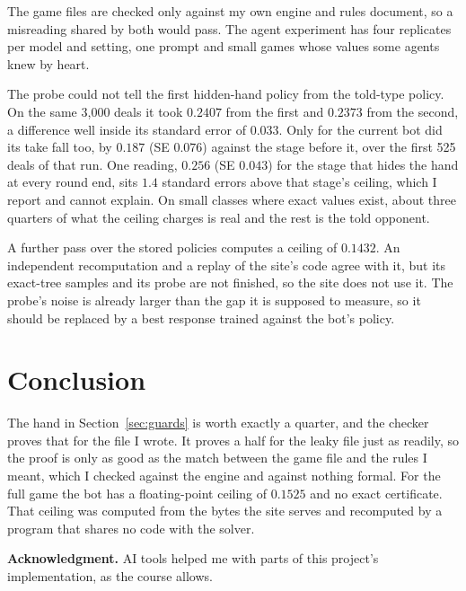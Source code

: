 \documentclass[11pt]{article}
\newcommand{\servedbound}{0.1525}      %
\begin{document}
The game files are
checked only against my own engine and rules document, so a misreading shared by both would pass.
The agent experiment has four replicates per model and setting, one prompt and small games whose values some
agents knew by heart.

The probe could not tell the first hidden-hand policy from the told-type policy.
On the same 3,000 deals it took $0.2407$ from the first and $0.2373$ from the second,
a difference well inside its standard error of $0.033$. Only for the current bot did its take
fall too, by $0.187$ (SE $0.076$) against the stage before it, over the first 525 deals of that run. One reading,
$0.256$ (SE $0.043$) for the stage that hides the hand at every round end, sits $1.4$ standard errors
above that stage's ceiling, which I report and cannot explain. On small classes where exact values
exist, about three quarters of what the ceiling charges is real and the rest is the told opponent.

A further pass over the stored policies computes a ceiling of $0.1432$. An independent
recomputation and a replay of the site's code agree with it, but its exact-tree samples and its
probe are not finished, so the site does not use it. The probe's noise is already larger than the
gap it is supposed to measure, so it should be replaced by a best response trained against the
bot's policy.

\section{Conclusion}

The hand in Section~\ref{sec:guards} is worth exactly a quarter, and the checker proves that for
the file I wrote. It proves a half for the leaky file just as readily, so the proof is only as good
as the match between the game file and the rules I meant, which I checked against the engine and
against nothing formal. For the full game the bot has a floating-point ceiling of $\servedbound$
and no exact certificate. That ceiling was computed from the bytes the site serves and recomputed
by a program that shares no code with the solver.

{\small\noindent\textbf{Acknowledgment.} AI tools helped me with parts of this project's
implementation, as the course allows.\par} %

{\footnotesize


}
\end{document}
